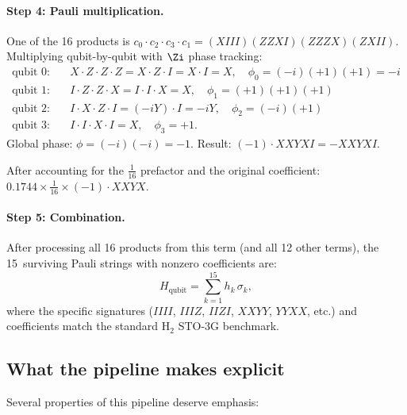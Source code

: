 \paragraph{Step 4: Pauli multiplication.}
One of the 16 products is
$c_0 \cdot c_2 \cdot c_3 \cdot c_1
= (XIII)(ZZXI)(ZZZX)(ZXII)$.
Multiplying qubit-by-qubit with $\Zi$ phase tracking:
\begin{align*}
  \text{qubit 0:}\quad & X \cdot Z \cdot Z \cdot Z
    = X \cdot Z \cdot I = X \cdot I = X, \quad \phi_0 = (-i)(+1)(+1) = -i \\
  \text{qubit 1:}\quad & I \cdot Z \cdot Z \cdot X = I \cdot I \cdot X = X,
    \quad \phi_1 = (+1)(+1)(+1) \\
  \text{qubit 2:}\quad & I \cdot X \cdot Z \cdot I = (-iY) \cdot I = -iY,
    \quad \phi_2 = (-i)(+1) \\
  \text{qubit 3:}\quad & I \cdot I \cdot X \cdot I = X,
    \quad \phi_3 = +1.
\end{align*}
Global phase: $\phi = (-i)(-i) = -1$.
Result: $(-1) \cdot XXYXI = -XXYXI$.

After accounting for the $\frac{1}{16}$ prefactor and the original
coefficient: $0.1744 \times \frac{1}{16} \times (-1) \cdot XXYX$.

\paragraph{Step 5: Combination.}
After processing all 16 products from this term (and all 12 other
terms), the 15~surviving Pauli strings with nonzero coefficients are:
\begin{equation*}
  H_\text{qubit} = \sum_{k=1}^{15} h_k\, \sigma_k,
\end{equation*}
where the specific signatures ($IIII$, $IIIZ$, $IIZI$, $XXYY$,
$YYXX$, etc.) and coefficients match the standard H$_2$ STO-3G
benchmark.

\subsection{What the pipeline makes explicit}
\label{sec:ham-observations}

Several properties of this pipeline deserve emphasis:

